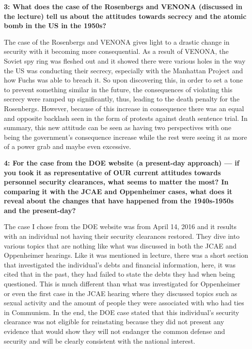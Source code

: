 \documentclass[12pt]{turabian-researchpaper}
\newcommand\question[2]{\noindent\textbf{#1: #2}}
\begin{document}
	\question{3}{What does the case of the Rosenbergs and VENONA (discussed in the lecture) tell us about the attitudes towards secrecy and the atomic bomb in the US in the 1950s?}

		The case of the Rosenbergs and VENONA gives light to a drastic change in security with it becoming more consequential. As a result of VENONA, the Soviet spy ring was fleshed out and it showed there were various holes in the way the US was conducting their secrecy, especially with the Manhattan Project and how Fuchs was able to breach it. So upon discovering this, in order to set a tone to prevent something similar in the future, the consequences of violating this secrecy were ramped up significantly, thus, leading to the death penalty for the Rosenbergs. However, because of this increase in consequence there was an equal and opposite backlash seen in the form of protests against death sentence trial. In summary, this new attitude can be seen as having two perspectives with one being the government's consequence increase while the rest were seeing it as more of a power grab and maybe even excessive.


	\question{4}{For the case from the DOE website (a present-day approach) — if you took it as representative of OUR current attitudes towards personnel security clearances, what seems to matter the most? In comparing it with the JCAE and Oppenheimer cases, what does it reveal about the changes that have happened from the 1940s-1950s and the present-day?}

		The case I chose from the DOE website was from April 14, 2016 and it results with an individual not having their security clearances restored. They dive into various topics that are nothing like what was discussed in both the JCAE and Oppenheimer hearings. Like it was mentioned in lecture, there was a short section that investigated the individual's debts and financial information, here, it was cited that in the past, they had failed to state the debts they had when being questioned. This is much different than what was investigated for Oppenheimer or even the first case in the JCAE hearing where they discussed topics such as sexual activity and the amount of people they were associated with who had ties in Communism. In the end, the DOE case stated that this individual's security clearance was not eligible for reinstating because they did not present any evidence that would show they will not endanger the common defense and security and will be clearly consistent with the national interest.
\end{document}
